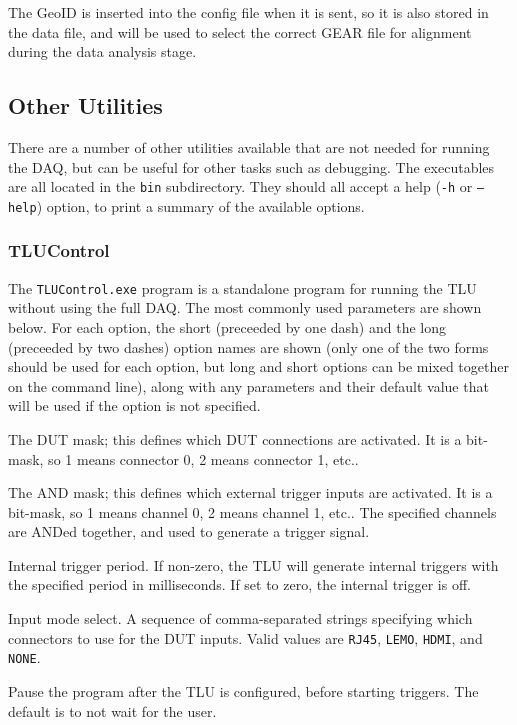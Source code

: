 The GeoID is inserted into the config file when it is sent, so it is also stored in the data file,
and will be used to select the correct GEAR file for alignment during the data analysis stage.

\subsection{Other Utilities}
There are a number of other utilities available that are not needed for running the DAQ,
but can be useful for other tasks such as debugging.
The executables are all located in the \texttt{bin} subdirectory.
They should all accept a help (\texttt{-h} or \texttt{--help}) option,
to print a summary of the available options.

\subsubsection{TLUControl}
The \texttt{TLUControl.exe} program is a standalone program for running the TLU without using the
full DAQ. The most commonly used parameters are shown below. For each option, the short (preceeded
by one dash) and the long (preceeded by two dashes) option names are shown (only one of the two
forms should be used for each option, but long and short options can be mixed together on the
command line), along with any parameters and their default value that will be used if the option is
not specified.

\begin{description}
The DUT mask; this defines which DUT connections are activated.  It is a bit-mask, so 1 means
connector 0, 2 means connector 1, etc..

The AND mask; this defines which external trigger inputs are activated. It is a bit-mask, so 1
means channel 0, 2 means channel 1, etc.. The specified channels are ANDed together, and used to
generate a trigger signal.

Internal trigger period.  If non-zero, the \gls{TLU} will generate internal triggers with the
specified period in milliseconds. If set to zero, the internal trigger is off.

Input mode select. A sequence of comma-separated strings specifying which connectors to use for the
DUT inputs. Valid values are \texttt{RJ45}, \texttt{LEMO}, \texttt{HDMI}, and \texttt{NONE}.

Pause the program after the \gls{TLU} is configured, before starting triggers. The default is to not
wait for the user.
\end{description}

